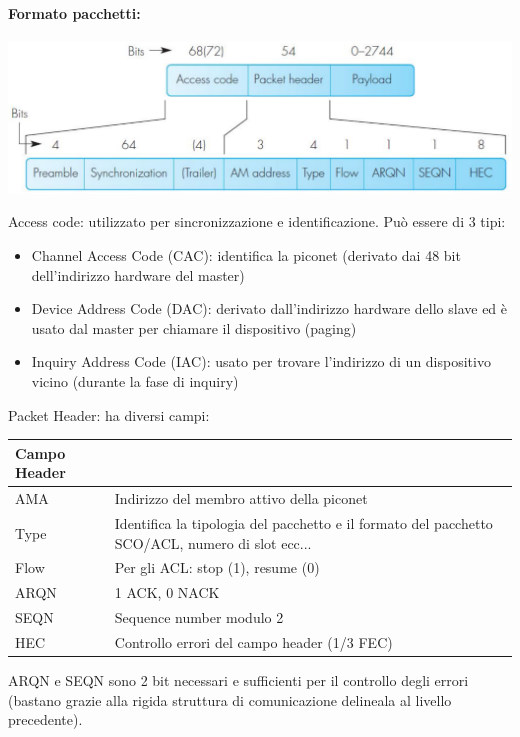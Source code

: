 \paragraph{Formato pacchetti:} 
\begin{center}
	\includegraphics[width=0.9\linewidth]{img/wpan/basebandpacket}
\end{center}
Access code: utilizzato per sincronizzazione e identificazione. Può essere di 3 tipi:
\begin{itemize}
	\item Channel Access Code (CAC): identifica la piconet (derivato dai 48 bit dell'indirizzo hardware del master)
	\item Device Address Code (DAC): derivato dall'indirizzo hardware dello slave ed è usato dal master per chiamare il dispositivo (paging)
	\item Inquiry Address Code (IAC): usato per trovare l'indirizzo di un dispositivo vicino (durante la fase di inquiry)
\end{itemize}

Packet Header: ha diversi campi: 
\begin{center}
	    \begin{tabular}{|l|p{10cm}|}
		\hline
		\textbf{Campo Header} & \\ \hline
		AMA & Indirizzo del membro attivo della piconet \\ \hline
		Type & Identifica la tipologia del pacchetto e il formato del pacchetto SCO/ACL, numero di slot ecc... \\ \hline
		Flow & Per gli ACL: stop (1), resume (0) \\ \hline
		ARQN & 1 ACK, 0 NACK \\ \hline
		SEQN & Sequence number modulo 2 \\ \hline
		HEC & Controllo errori del campo header (1/3 FEC) \\ \hline
	\end{tabular}
\end{center}
ARQN e SEQN sono 2 bit necessari e sufficienti per il controllo degli errori (bastano grazie alla rigida struttura di comunicazione delineala al livello precedente).\\

